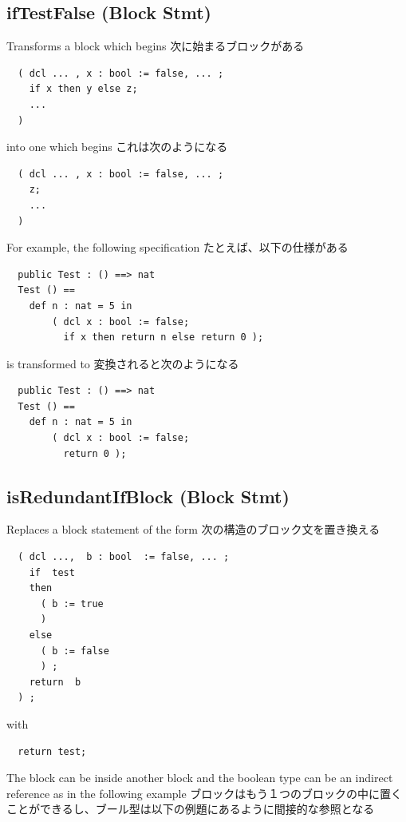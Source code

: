 \documentclass[\pformat,12pt]{jarticle}
\begin{document}
\subsection{ifTestFalse (Block Stmt)}

  Transforms a block which begins
 次に始まるブロックがある

\begin{verbatim}
  ( dcl ... , x : bool := false, ... ; 
    if x then y else z;
    ...
  )
\end{verbatim}

into one which begins
これは次のようになる

\begin{verbatim}
  ( dcl ... , x : bool := false, ... ; 
    z;
    ...
  )
\end{verbatim}

For example, the following specification
たとえば、以下の仕様がある

\begin{verbatim}
  public Test : () ==> nat  
  Test () ==
    def n : nat = 5 in
        ( dcl x : bool := false;
          if x then return n else return 0 );
\end{verbatim}

is transformed to
変換されると次のようになる

\begin{verbatim}
  public Test : () ==> nat  
  Test () ==
    def n : nat = 5 in
        ( dcl x : bool := false;
          return 0 );
\end{verbatim}


\subsection{isRedundantIfBlock (Block Stmt)}
  Replaces a block statement of the form 
  次の構造のブロック文を置き換える

\begin{verbatim}
  ( dcl ...,  b : bool  := false, ... ;
    if  test 
    then  
      ( b := true  
      ) 
    else  
      ( b := false  
      ) ;
    return  b
  ) ;
\end{verbatim}
  
with 

\begin{verbatim}
  return test;
\end{verbatim}

The block can be inside another block and the boolean type can be an
indirect reference as in the following example
ブロックはもう１つのブロックの中に置くことができるし、ブール型は以下の例題にあるように間接的な参照となる
\end{document}
